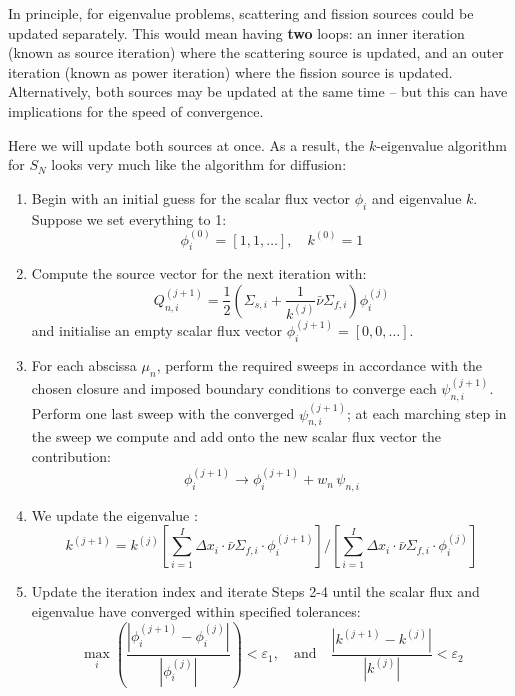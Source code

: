 \documentclass{article}
\begin{document}
In principle, for eigenvalue problems, scattering and fission sources could be updated separately. This would mean having \textbf{two} loops: an inner iteration (known as source iteration) where the scattering source is updated, and an outer iteration (known as power iteration) where the fission source is updated. Alternatively, both sources may be updated at the same time -- but this can have implications for the speed of convergence.

Here we will update both sources at once. As a result, the $k$-eigenvalue algorithm for $S_N$ looks very much like the algorithm for diffusion:
\begin{enumerate}
    \item Begin with an initial guess for the scalar flux vector $\phi_i$ and eigenvalue $k$. Suppose we set everything to 1:
    \begin{equation}
        \phi^{(0)}_i=[1,1,\dots],\quad k^{(0)}=1
    \end{equation}
    \item Compute the source vector for the next iteration with:
    \begin{equation}
        Q^{(j+1)}_{n,i}=\frac{1}{2}\left(\Sigma_{s,i}+\frac{1}{k^{(j)}}\bar{\nu}\Sigma_{f,i}\right)\phi^{(j)}_i
    \end{equation}
    and initialise an empty scalar flux vector $\phi^{(j+1)}_i=[0,0,\dots]$.
    \item For each abscissa $\mu_n$, perform the required sweeps in accordance with the chosen closure and imposed boundary conditions to converge each $\psi^{(j+1)}_{n,i}$. Perform one last sweep with the converged $\psi^{(j+1)}_{n,i}$; at each marching step in the sweep we compute and add onto the new scalar flux vector the contribution:
    \begin{equation}
        \phi^{(j+1)}_i\rightarrow\phi^{(j+1)}_i + w_n\,\psi_{n,i}
    \end{equation}
    \item We update the eigenvalue :
    \begin{equation}
        k^{(j+1)}=k^{(j)}\left[\sum_{i=1}^I\Delta x_i\cdot\bar{\nu}\Sigma_{f,i}\cdot\phi^{(j+1)}_i\right]
        \bigg/\left[\sum_{i=1}^I\Delta x_i\cdot\bar{\nu}\Sigma_{f,i}\cdot\phi^{(j)}_i\right]
    \end{equation}
    \item Update the iteration index and iterate Steps 2-4 until the scalar flux and eigenvalue have converged within specified tolerances:
    \begin{equation}
        \max_i\left(\frac{|\phi^{(j+1)}_i-\phi^{(j)}_i|}{|\phi^{(j)}_i|}\right)<\varepsilon_1,\quad\text{and}\quad\frac{|k^{(j+1)}-k^{(j)}|}{|k^{(j)}|}<\varepsilon_2
    \end{equation}
\end{enumerate}
\end{document}
